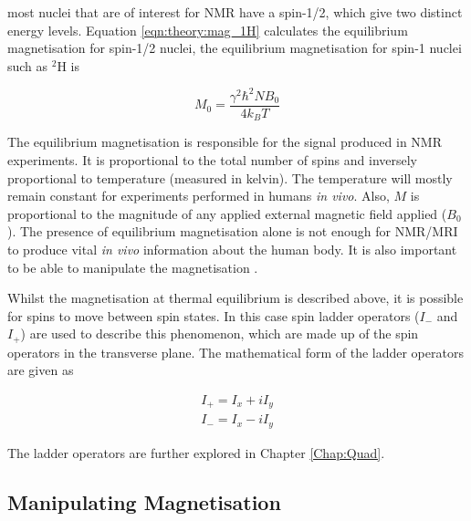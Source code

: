 \noindent most nuclei that are of interest for \ac{NMR} have a spin-1/2, which give two distinct energy levels. Equation \ref{eqn:theory:mag_1H} calculates the equilibrium magnetisation for spin-1/2 nuclei, the equilibrium magnetisation for spin-1 nuclei such as $^2$H is

\begin{equation}
    M_0 = \frac{\gamma^2 \hbar^2 N B_0}{4k_BT}
    \label{eqn:theory:mag_1H}
\end{equation}

The equilibrium magnetisation is responsible for the signal produced in \ac{NMR} experiments. It is proportional to the total number of spins and inversely proportional to temperature (measured in kelvin). The temperature will mostly remain constant for experiments performed in humans \textit{in vivo}. Also, $M$ is proportional to the magnitude of any applied external magnetic field applied ($B_0$). The presence of equilibrium magnetisation alone is not enough for \ac{NMR}/\ac{MRI} to produce vital \textit{in vivo} information about the human body. It is also important to be able to manipulate the magnetisation \cite{Haacke2014MagneticDesign}. 

Whilst the magnetisation at thermal equilibrium is described above, it is possible for spins to move between spin states. In this case spin ladder operators ($I_-$ and $I_+$) are used to describe this phenomenon, which are made up of the spin operators in the transverse plane. The mathematical form of the ladder operators are given as

\begin{equation}
    \begin{gathered}
        I_+ = I_x + iI_y \\
        I_- = I_x - iI_y  
    \end{gathered}    
    \label{eqn:theory:ladder}
\end{equation}

The ladder operators are further explored in Chapter \ref{Chap:Quad}.

\subsection{Manipulating Magnetisation}

\label{Chap:Theory:Magnetisation}

